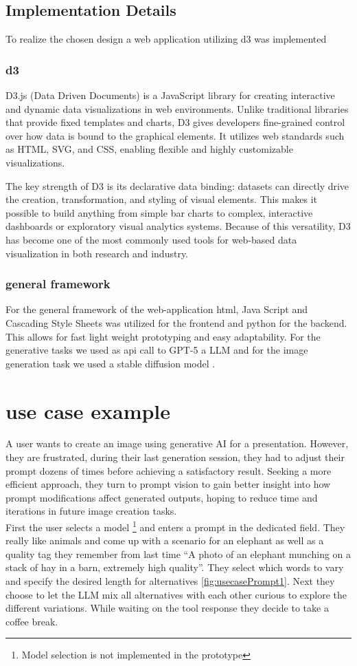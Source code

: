 \documentclass[
  a4paper,  %
  twoside,  %
  bibliography=totoc,
  headsepline,
  cleardoublepage=empty,
  parskip=half,
  draft=false
]{scrbook}
\begin{document}
\section{Implementation Details}
To realize the chosen design a web application utilizing d3 was implemented
\subsection{d3}
D3.js (Data Driven Documents) is a JavaScript library for creating interactive and dynamic data visualizations in web environments. Unlike traditional libraries that provide fixed templates and charts, D3 gives developers fine-grained control over how data is bound to the graphical elements. It utilizes web standards such as HTML, SVG, and CSS, enabling flexible and highly customizable visualizations.

The key strength of D3 is its declarative data binding: datasets can directly drive the creation, transformation, and styling of visual elements. This makes it possible to build anything from simple bar charts to complex, interactive dashboards or exploratory visual analytics systems. Because of this versatility, D3 has become one of the most commonly used tools for web-based data visualization in both research and industry.

\subsection{general framework}
For the general framework of the web-application html, Java Script and Cascading Style Sheets was utilized for the frontend and python for the backend.
This allows for fast light weight prototyping and easy adaptability. For the generative tasks we used as api call to GPT-5 a LLM and for the image generation task we used a stable diffusion model \cite{stableDiffusion}.
                                                                        

\chapter{use case example}
A user wants to create an image using generative AI for a presentation. However, they are frustrated, during their last generation session, they had to adjust their prompt dozens of times before achieving a satisfactory result. Seeking a more efficient approach, they turn to prompt vision to gain better insight into how prompt modifications affect generated outputs, hoping to reduce time and iterations in future image creation tasks.\\
First the user selects a model \footnote{Model selection is not implemented in the prototype} and enters a prompt in the dedicated field. They really like animals and come up with a scenario for an elephant as well as a quality tag they remember from last time \enquote{A photo of an elephant munching on a stack of hay in a barn, extremely high quality}. They select which words to vary and specify the desired length for alternatives \cref{fig:usecasePrompt1}. Next they choose to let the LLM mix all alternatives with each other curious to explore the different variations. While waiting on the tool response they decide to take a coffee break. 
\end{document}
